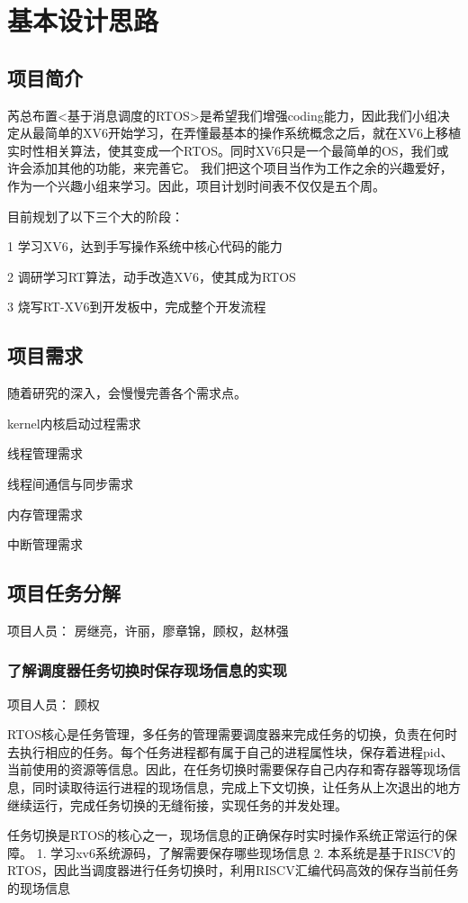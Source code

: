 

\chapter{基本设计思路}
\section{项目简介}
芮总布置<基于消息调度的RTOS>是希望我们增强coding能力，因此我们小组决定从最简单的XV6开始学习，在弄懂最基本的操作系统概念之后，就在XV6上移植实时性相关算法，使其变成一个RTOS。同时XV6只是一个最简单的OS，我们或许会添加其他的功能，来完善它。{\color{red} 我们把这个项目当作为工作之余的兴趣爱好，作为一个兴趣小组来学习。因此，项目计划时间表不仅仅是五个周。}

目前规划了以下三个大的阶段：

1 学习XV6，达到手写操作系统中核心代码的能力

2 调研学习RT算法，动手改造XV6，使其成为RTOS

3 烧写RT-XV6到开发板中，完成整个开发流程


\section{项目需求}
随着研究的深入，会慢慢完善各个需求点。

kernel内核启动过程需求

线程管理需求

线程间通信与同步需求 

内存管理需求

中断管理需求
\section{项目任务分解}
项目人员： 房继亮，许丽，廖章锦，顾权，赵林强
\subsection{了解调度器任务切换时保存现场信息的实现}
项目人员： 顾权

RTOS核心是任务管理，多任务的管理需要调度器来完成任务的切换，负责在何时去执行相应的任务。每个任务进程都有属于自己的进程属性块，保存着进程pid、当前使用的资源等信息。因此，在任务切换时需要保存自己内存和寄存器等现场信息，同时读取待运行进程的现场信息，完成上下文切换，让任务从上次退出的地方继续运行，完成任务切换的无缝衔接，实现任务的并发处理。

任务切换是RTOS的核心之一，现场信息的正确保存时实时操作系统正常运行的保障。
1. 学习xv6系统源码，了解需要保存哪些现场信息
2. 本系统是基于RISCV的RTOS，因此当调度器进行任务切换时，利用RISCV汇编代码高效的保存当前任务的现场信息
